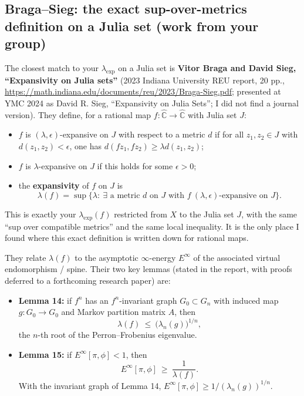 \documentclass[
]{article}
\providecommand{\tightlist}{%
  \setlength{\itemsep}{0pt}\setlength{\parskip}{0pt}}
\begin{document}
\subsection{Braga--Sieg: the exact sup-over-metrics definition on a
Julia set (work from your
group)}\label{bragasieg-the-exact-sup-over-metrics-definition-on-a-julia-set-work-from-your-group}

The closest match to your \(\lambda_{\exp}\) on a Julia set is
\textbf{Vitor Braga and David Sieg, ``Expansivity on Julia sets''} (2023
Indiana University REU report, 20 pp.,
\url{https://math.indiana.edu/documents/reu/2023/Braga-Sieg.pdf};
presented at YMC 2024 as David R. Sieg, ``Expansivity on Julia Sets''; I
did not find a journal version). They define, for a rational map
\(f:\widehat{\mathbb C}\to\widehat{\mathbb C}\) with Julia set \(J\):

\begin{itemize}
\tightlist
\item
  \(f\) is \((\lambda,\epsilon)\)-expansive on \(J\) with respect to a
  metric \(d\) if for all \(z_1,z_2\in J\) with \(d(z_1,z_2)<\epsilon\),
  one has \(d(fz_1,fz_2)\ge \lambda d(z_1,z_2)\);
\item
  \(f\) is \(\lambda\)-expansive on \(J\) if this holds for some
  \(\epsilon>0\);
\item
  the \textbf{expansivity} of \(f\) on \(J\) is \[
  \lambda(f)=\sup\{\lambda:\ \exists\text{ a metric }d\text{ on }J\text{ with }f\ (\lambda,\epsilon)\text{-expansive on }J\}.
  \]
\end{itemize}

This is exactly your \(\lambda_{\exp}(f)\) restricted from \(X\) to the
Julia set \(J\), with the same ``sup over compatible metrics'' and the
same local inequality. It is the only place I found where this exact
definition is written down for rational maps.

They relate \(\lambda(f)\) to the asymptotic \(\infty\)-energy
\(E^\infty\) of the associated virtual endomorphism / spine. Their two
key lemmas (stated in the report, with proofs deferred to a forthcoming
research paper) are:

\begin{itemize}
\tightlist
\item
  \textbf{Lemma 14:} if \(f^n\) has an \(f^n\)-invariant graph
  \(G_0\subset G_n\) with induced map \(g:G_0\to G_0\) and Markov
  partition matrix \(A\), then \[
  \lambda(f)\ \le\ \bigl(\lambda_n(g)\bigr)^{1/n},
  \] the \(n\)-th root of the Perron--Frobenius eigenvalue.
\item
  \textbf{Lemma 15:} if \(E^\infty[\pi,\phi]<1\), then \[
  E^\infty[\pi,\phi]\ \ge\ \frac{1}{\lambda(f)}.
  \] With the invariant graph of Lemma 14,
  \(E^\infty[\pi,\phi]\ge 1/(\lambda_n(g))^{1/n}\).
\end{itemize}
\end{document}
